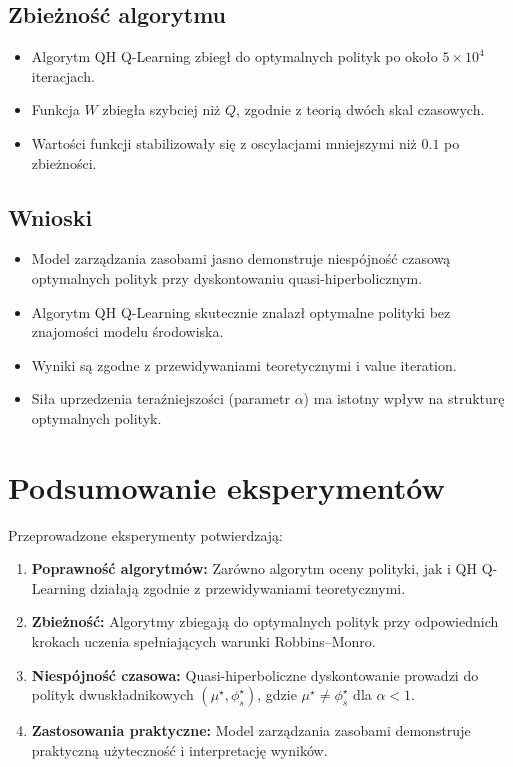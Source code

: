 \subsection{Zbieżność algorytmu}

\begin{itemize}
\item Algorytm QH Q-Learning zbiegł do optymalnych polityk po około $5 \times 10^4$ iteracjach.
\item Funkcja $W$ zbiegła szybciej niż $Q$, zgodnie z teorią dwóch skal czasowych.
\item Wartości funkcji stabilizowały się z oscylacjami mniejszymi niż $0.1$ po zbieżności.
\end{itemize}

\subsection{Wnioski}

\begin{itemize}
\item Model zarządzania zasobami jasno demonstruje niespójność czasową optymalnych polityk przy dyskontowaniu quasi-hiperbolicznym.
\item Algorytm QH Q-Learning skutecznie znalazł optymalne polityki bez znajomości modelu środowiska.
\item Wyniki są zgodne z przewidywaniami teoretycznymi i value iteration.
\item Siła uprzedzenia teraźniejszości (parametr $\alpha$) ma istotny wpływ na strukturę optymalnych polityk.
\end{itemize}

\section{Podsumowanie eksperymentów}

Przeprowadzone eksperymenty potwierdzają:

\begin{enumerate}
\item \textbf{Poprawność algorytmów:} Zarówno algorytm oceny polityki, jak i QH Q-Learning działają zgodnie z przewidywaniami teoretycznymi.
\item \textbf{Zbieżność:} Algorytmy zbiegają do optymalnych polityk przy odpowiednich krokach uczenia spełniających warunki Robbins--Monro.
\item \textbf{Niespójność czasowa:} Quasi-hiperboliczne dyskontowanie prowadzi do polityk dwuskładnikowych $(\mu^\star, \phi_s^\star)$, gdzie $\mu^\star \neq \phi_s^\star$ dla $\alpha < 1$.
\item \textbf{Zastosowania praktyczne:} Model zarządzania zasobami demonstruje praktyczną użyteczność i interpretację wyników.
\end{enumerate}
